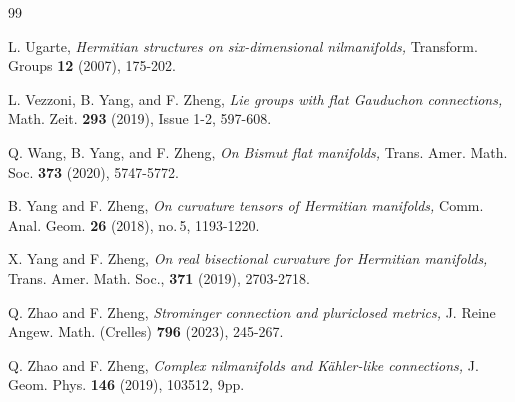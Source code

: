 \documentclass{amsart}
\begin{document}
\begin{thebibliography}{99}



 L. Ugarte, \emph{Hermitian structures on six-dimensional nilmanifolds,} Transform. Groups {\bf 12} (2007), 175-202.





 L. Vezzoni, B. Yang, and F. Zheng, \emph{ Lie groups with flat Gauduchon connections,} Math. Zeit. \textbf{293} (2019), Issue 1-2, 597-608.


 Q. Wang, B. Yang, and F. Zheng, \emph{On Bismut flat manifolds,} Trans. Amer. Math. Soc. {\bf 373} (2020), 5747-5772.

 B. Yang and F. Zheng, \emph{On curvature tensors of Hermitian manifolds,} Comm. Anal. Geom. {\bf 26} (2018), no.\,5, 1193-1220.


 X. Yang and F. Zheng, {\em On real bisectional curvature for Hermitian manifolds,} Trans. Amer. Math. Soc., {\bf 371} (2019),  2703-2718.






 Q. Zhao and F. Zheng, \emph{Strominger connection and pluriclosed metrics,}  J. Reine Angew. Math. (Crelles) {\bf 796} (2023), 245-267.

 Q. Zhao and F. Zheng, \emph{Complex nilmanifolds and K\"ahler-like connections,} J. Geom. Phys. {\bf 146} (2019), 103512, 9pp.




\end{thebibliography}
\end{document}
